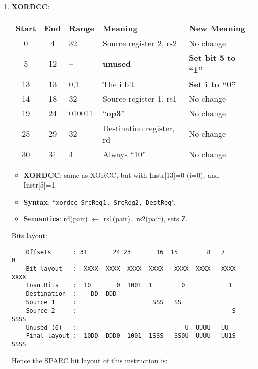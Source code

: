\begin{enumerate}
\item \textbf{XORDCC}:\\
  \begin{center}
    \begin{tabular}[p]{|c|c|l|l|l|}
      \hline
      \textbf{Start} & \textbf{End} & \textbf{Range} & \textbf{Meaning} &
                                                                          \textbf{New Meaning}\\
      \hline
      0 & 4 & 32 & Source register 2, rs2 & No change \\
      5 & 12 & -- & \textbf{unused} & \textbf{Set bit 5 to ``1''} \\
      13 & 13 & 0,1 & The \textbf{i} bit & \textbf{Set i to ``0''} \\
      14 & 18 & 32 & Source register 1, rs1 & No change \\
      19 & 24 & 010011 & ``\textbf{op3}'' & No change \\
      25 & 29 & 32 & Destination register, rd & No change \\
      30 & 31 & 4 & Always ``10'' & No change \\
      \hline
    \end{tabular}
  \end{center}
  \begin{itemize}
  \item []\textbf{XORDCC}: same as XORCC, but with Instr[13]=0 (i=0), and
    Instr[5]=1.
  \item []\textbf{Syntax}: ``\texttt{xordcc  SrcReg1, SrcReg2, DestReg}''.
  \item []\textbf{Semantics}: rd(pair) $\leftarrow$ rs1(pair) $\hat{~}$
    rs2(pair), sets Z.
  \end{itemize}
  Bits layout:
\begin{verbatim}
    Offsets      : 31       24 23       16  15        8   7        0
    Bit layout   :  XXXX  XXXX  XXXX  XXXX   XXXX  XXXX   XXXX  XXXX
    Insn Bits    :  10       0  1001  1        0            1       
    Destination  :    DD  DDD                                       
    Source 1     :                     SSS   SS
    Source 2     :                                           S  SSSS
    Unused (0)   :                              U  UUUU   UU        
    Final layout :  10DD  DDD0  1001  1SSS   SS0U  UUUU   UU1S  SSSS
\end{verbatim}

  Hence the SPARC bit layout of this instruction is:


\end{enumerate}
